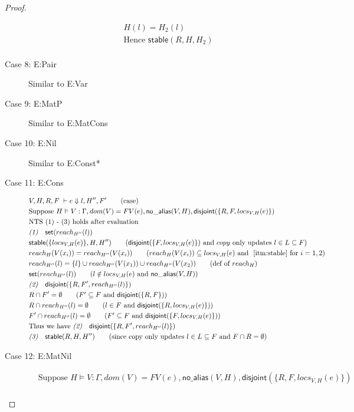 \documentclass[sigconf]{acmart}
\newcommand{\ms}[1]{\ensuremath{\mathsf{#1}}}
\newcommand{\na}[1]{\mathsf{no\_alias}(#1)}
\newcommand{\stable}[1]{\mathsf{stable}(#1)}
\newcommand{\set}[1]{\mathsf{set}(#1)}
\newcommand{\dist}[1]{\mathsf{disjoint}(#1)}
\theoremstyle{definition}
\begin{document}
\begin{proof}
\begin{description}
\begin{align*}
  &H(l) = H_2(l)\\
  &\text{Hence } \stable{R,H,H_2}\\
  \end{align*}
  \item[Case 8: E:Pair]
  Similar to E:Var
  \item[Case 9: E:MatP]
  Similar to E:MatCons
  \item[Case 10: E:Nil]
  Similar to E:Const*
  \item[Case 11: E:Cons]
  \begin{align*}
  &V,H,R,F \; \vdash e \Downarrow l,H'',F' \tag{case}\\
  &\text{Suppose } H \vDash V : \Gamma, dom(V) = FV(e), \na{V,H}, \dist{\{R,F,locs_{V,H}(e)\}}\\
  &\text{NTS (1) - (3) holds after evaluation }\\
  &\emph{(1)} \quad \ms{set}(reach_{H''}(l))\\
  &\stable{\{locs_{V,H}(e)\},H,H''} \tag{$\dist{\{F,locs_{V,H}(e)\}}$ and $copy$ only updates $l \in L \subseteq F$}\\
  &reach_H(V(x_i)) = reach_{H''}(V(x_i)) \tag{$reach_H(V(x_i)) \subseteq locs_{V,H}(e)$ and $~\ref{itm:stable}$ for $i = 1,2$}\\
  &reach_{H''}(l) = \{l\} \cup reach_{H''}(V(x_1))\cup reach_{H''}(V(x_2)) \tag{def of $reach_H$}\\
  &\set{reach_{H''}(l)} \tag{$l \notin locs_{V,H}(e)$ and $\na{V,H}$}\\ 
  &\emph{(2)} \quad \dist{\{R,F',reach_{H''}(l)\}}\\
  &R \cap F' = \emptyset \tag{$F' \subseteq F$ and $\dist{\{R,F\}}$}\\
  &R \cap reach_{H''}(l) = \emptyset \tag{$l \in F$ and $\dist{\{R,locs_{V,H}(e)\}}$}\\
  &F' \cap reach_{H''}(l) = \emptyset\tag{$F' \subseteq F$ and $\dist{\{F,locs_{V,H}(e)\}}$}\\
  &\text{Thus we have }\emph{(2)} \quad \dist{\{R,F',reach_{H''}(l)\}}\\
  &\emph{(3)} \quad \stable{R,H,H''} \tag{since copy only updates $l \in L \subseteq F$ and $F \cap R = \emptyset$}\\
  \end{align*}
  \item[Case 12: E:MatNil]
  \begin{align*}
  &\text{Suppose } H \vDash V : \Gamma, dom(V) = FV(e), \na{V,H}, \dist{\{R,F,locs_{V,H}(e)\}}\\

\end{align*}
\end{description}
\end{proof}
\end{document}
